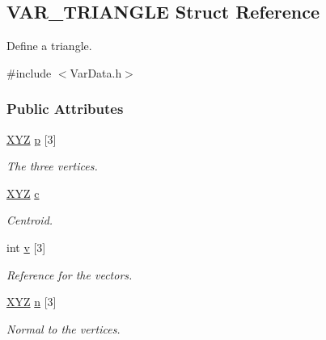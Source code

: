 \hypertarget{structVAR__TRIANGLE}{}\subsection{V\+A\+R\+\_\+\+T\+R\+I\+A\+N\+G\+LE Struct Reference}
\label{structVAR__TRIANGLE}


Define a triangle.  




{\ttfamily \#include $<$Var\+Data.\+h$>$}

\subsubsection*{Public Attributes}
\begin{DoxyCompactItemize}
\item 
\hyperlink{structXYZ}{X\+YZ} \hyperlink{structVAR__TRIANGLE_abb19475a6b83f96d1f41b2a120910022}{p} \mbox{[}3\mbox{]}\hypertarget{structVAR__TRIANGLE_abb19475a6b83f96d1f41b2a120910022}{}\label{structVAR__TRIANGLE_abb19475a6b83f96d1f41b2a120910022}

\begin{DoxyCompactList}\small\item\em The three vertices. \end{DoxyCompactList}\item 
\hyperlink{structXYZ}{X\+YZ} \hyperlink{structVAR__TRIANGLE_ae93aa7b3bc74295f6f1118a6b0a0e804}{c}\hypertarget{structVAR__TRIANGLE_ae93aa7b3bc74295f6f1118a6b0a0e804}{}\label{structVAR__TRIANGLE_ae93aa7b3bc74295f6f1118a6b0a0e804}

\begin{DoxyCompactList}\small\item\em Centroid. \end{DoxyCompactList}\item 
int \hyperlink{structVAR__TRIANGLE_adf75f0e81beb91b0ef5de318ab595455}{v} \mbox{[}3\mbox{]}\hypertarget{structVAR__TRIANGLE_adf75f0e81beb91b0ef5de318ab595455}{}\label{structVAR__TRIANGLE_adf75f0e81beb91b0ef5de318ab595455}

\begin{DoxyCompactList}\small\item\em Reference for the vectors. \end{DoxyCompactList}\item 
\hyperlink{structXYZ}{X\+YZ} \hyperlink{structVAR__TRIANGLE_a1db8f1be3299f0c5f218cf0142c6c687}{n} \mbox{[}3\mbox{]}\hypertarget{structVAR__TRIANGLE_a1db8f1be3299f0c5f218cf0142c6c687}{}\label{structVAR__TRIANGLE_a1db8f1be3299f0c5f218cf0142c6c687}

\begin{DoxyCompactList}\small\item\em Normal to the vertices. \end{DoxyCompactList}\end{DoxyCompactItemize}


